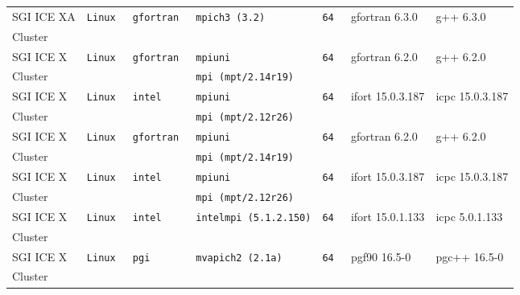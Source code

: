 \begin{longtable}{lllllll}
SGI ICE XA            &\tt Linux  &\tt gfortran     &\tt mpich3 (3.2)     &\tt 64           & gfortran \footnotesize 6.3.0        & g++ \footnotesize 6.3.0           \\
Cluster               &           &                 &                     &                 &                                     &                                   \\
SGI ICE X             &\tt Linux  &\tt gfortran     &\tt mpiuni           &\tt 64           & gfortran \footnotesize 6.2.0        & g++ \footnotesize 6.2.0           \\
Cluster               &           &                 &\tt mpi (mpt/2.14r19)&                 &                                     &                                   \\
SGI ICE X             &\tt Linux  &\tt intel        &\tt mpiuni           &\tt 64           & ifort \footnotesize 15.0.3.187      & icpc \footnotesize 15.0.3.187     \\
Cluster               &           &                 &\tt mpi (mpt/2.12r26)&                 &                                     &                                   \\
SGI ICE X             &\tt Linux  &\tt gfortran     &\tt mpiuni           &\tt 64           & gfortran \footnotesize 6.2.0        & g++ \footnotesize 6.2.0           \\
Cluster               &           &                 &\tt mpi (mpt/2.14r19)&                 &                                     &                                   \\
SGI ICE X             &\tt Linux  &\tt intel        &\tt mpiuni           &\tt 64           & ifort \footnotesize 15.0.3.187      & icpc \footnotesize 15.0.3.187     \\
Cluster               &           &                 &\tt mpi (mpt/2.12r26)&                 &                                     &                                   \\
SGI ICE X             &\tt Linux  &\tt intel        &\tt intelmpi (5.1.2.150)&\tt 64        & ifort \footnotesize 15.0.1.133      & icpc \footnotesize 5.0.1.133      \\
Cluster               &           &                 &                     &                 &                                     &                                   \\
SGI ICE X             &\tt Linux  &\tt pgi          &\tt mvapich2 (2.1a)  &\tt 64           & pgf90 \footnotesize 16.5-0          & pgc++ \footnotesize 16.5-0        \\
Cluster               &           &                 &                     &                 &                                     &                                   
\end{longtable}

